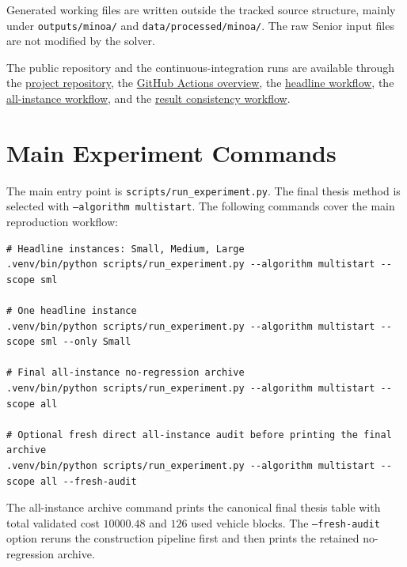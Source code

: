 Generated working files are written outside the tracked source structure, mainly
under \texttt{outputs/minoa/} and \texttt{data/processed/minoa/}. The raw Senior
input files are not modified by the solver.

The public repository and the continuous-integration runs are available through
the \href{https://github.com/mirza019/minoa-mixed-fleet-solver}{project
repository}, the \href{https://github.com/mirza019/minoa-mixed-fleet-solver/actions}{GitHub
Actions overview}, the
\href{https://github.com/mirza019/minoa-mixed-fleet-solver/actions/workflows/minoa-headline-instances.yml}{headline
workflow}, the
\href{https://github.com/mirza019/minoa-mixed-fleet-solver/actions/workflows/minoa-all-instances.yml}{all-instance
workflow}, and the
\href{https://github.com/mirza019/minoa-mixed-fleet-solver/actions/workflows/results-check.yml}{result
consistency workflow}.

\section{Main Experiment Commands}

The main entry point is \texttt{scripts/run\_experiment.py}. The final thesis
method is selected with \texttt{--algorithm multistart}. The following commands
cover the main reproduction workflow:

\begin{lstlisting}[basicstyle=\ttfamily\scriptsize,breaklines=true,aboveskip=4pt,belowskip=4pt]
# Headline instances: Small, Medium, Large
.venv/bin/python scripts/run_experiment.py --algorithm multistart --scope sml

# One headline instance
.venv/bin/python scripts/run_experiment.py --algorithm multistart --scope sml --only Small

# Final all-instance no-regression archive
.venv/bin/python scripts/run_experiment.py --algorithm multistart --scope all

# Optional fresh direct all-instance audit before printing the final archive
.venv/bin/python scripts/run_experiment.py --algorithm multistart --scope all --fresh-audit
\end{lstlisting}

The all-instance archive command prints the canonical final thesis table with
total validated cost \(10000.48\) and \(126\) used vehicle blocks. The
\texttt{--fresh-audit} option reruns the construction pipeline first and then
prints the retained no-regression archive.

